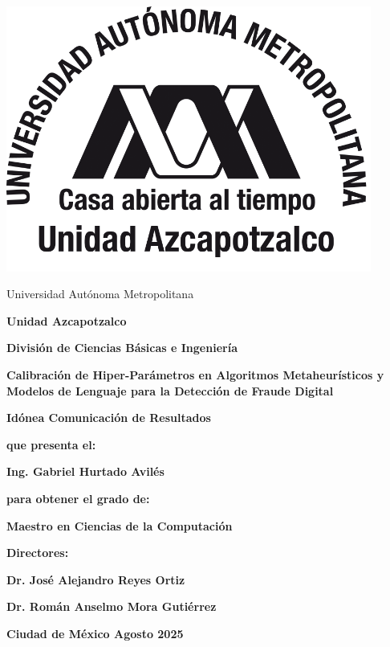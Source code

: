 \thispagestyle{empty}

\begin{minipage}{0.18\textwidth}
	\includegraphics[width=0.9\textwidth]{./Imagenes/uam.png}
\end{minipage}%
\begin{minipage}{0.82\textwidth}
\begin{center}
	\large \sc Universidad Autónoma Metropolitana
\end{center}
\end{minipage}

\vspace{0.5cm}
\centerline{\Large \bf Unidad Azcapotzalco}
\vspace{0.5cm}
\centerline{\Large \bf División de Ciencias Básicas e Ingeniería}

\begin{center}
\Large \bf
Calibración de Hiper-Parámetros en Algoritmos Metaheurísticos y Modelos de Lenguaje para la Detección de Fraude Digital
\end{center}

\centerline{\Large \bf Idónea Comunicación de Resultados}

\vspace{0.8cm}
\centerline{\large \bf que presenta el:}
\vspace{0.3cm}
\centerline{\Large \bf Ing. Gabriel Hurtado Avilés}
\vspace{0.5cm}
\centerline{\large \bf para obtener el grado de:}
\vspace{0.3cm}
\centerline{\Large \bf Maestro en Ciencias de la Computación}
\vspace{1.2cm}
\centerline{\Large \bf Directores:}
\vspace{0.5cm}
\centerline{\Large \bf Dr. José Alejandro Reyes Ortiz}
\vspace{0.3cm}
\centerline{\Large \bf Dr. Román Anselmo Mora Gutiérrez}
 
\vspace{1.2cm}
{\large \bf Ciudad de México \hfill Agosto 2025}